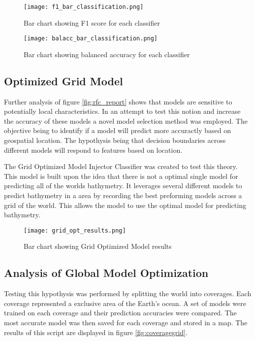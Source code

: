 \begin{figure}[]
    \centering
    \texttt{[image: f1\_bar\_classification.png]}
    \caption{Bar chart showing F1 score for each classifier}
    \label{fig:f1_barplot_classification}
\end{figure}

\begin{figure}[]
    \centering
    \texttt{[image: balacc\_bar\_classification.png]}
    \caption{Bar chart showing balanced accuracy for each classifier}
    \label{fig:balacc_barplot_classification}
\end{figure}

\subsection{Optimized Grid Model}
\setlength{\parindent}{10ex}
Further analysis of figure \ref{fig:rfc_report} shows that models are sensitive to potentially local characteristics.
In an attempt to test this notion and increase the accuracy of these models a novel model selection method was employed.
The objective being to identify if a model will predict more accuractly based on geospatial location.
The hypothysis being that decision boundaries across different models will respond to features based on location.

The Grid Optimized Model Injector Classifier was created to test this theory.
This model is built upon the idea that there is not a optimal single model for predicting all of the worlds bathymetry.
It leverages several different models to predict bathymetry in a area by recording the best preforming models across a grid of the world.
This allows the model to use the optimal model for predicting bathymetry.

\begin{figure}[]
    \centering
    \texttt{[image: grid\_opt\_results.png]}
    \caption{Bar chart showing Grid Optimized Model results}
    \label{fig:grid_opt_barplot}
\end{figure}

\subsection{Analysis of Global Model Optimization}
Testing this hypothysis was performed by splitting the world into coverages.
Each coverage represented a exclusive area of the Earth's ocean.
A set of models were trained on each coverage and their prediction accuracies were compared.
The most accurate model was then saved for each coverage and stored in a map.
The results of this script are displayed in figure \ref{fig:coveragegrid}.

